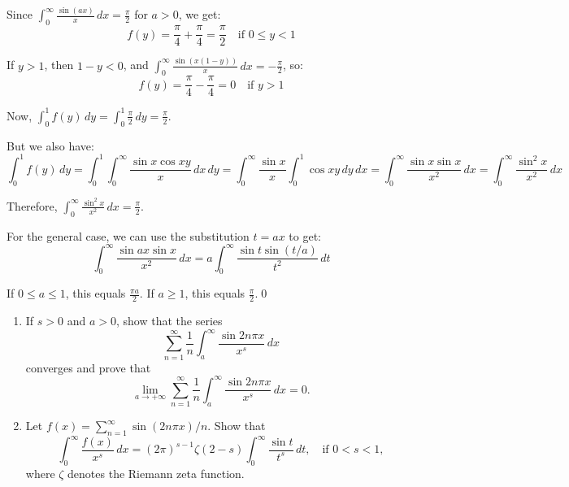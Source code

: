 Since $\int_{0}^{\infty} \frac{\sin(ax)}{x} \, dx = \frac{\pi}{2}$ for $a > 0$, we get:
\[f(y) = \frac{\pi}{4} + \frac{\pi}{4} = \frac{\pi}{2} \quad \text{if } 0 \leq y < 1\]

If $y > 1$, then $1-y < 0$, and $\int_{0}^{\infty} \frac{\sin(x(1-y))}{x} \, dx = -\frac{\pi}{2}$, so:
\[f(y) = \frac{\pi}{4} - \frac{\pi}{4} = 0 \quad \text{if } y > 1\]

Now, $\int_{0}^{1} f(y) \, dy = \int_{0}^{1} \frac{\pi}{2} \, dy = \frac{\pi}{2}$.

But we also have:
\[\int_{0}^{1} f(y) \, dy = \int_{0}^{1} \int_{0}^{\infty} \frac{\sin x \cos xy}{x} \, dx \, dy = \int_{0}^{\infty} \frac{\sin x}{x} \int_{0}^{1} \cos xy \, dy \, dx = \int_{0}^{\infty} \frac{\sin x \sin x}{x^2} \, dx = \int_{0}^{\infty} \frac{\sin^2 x}{x^2} \, dx\]

Therefore, $\int_{0}^{\infty} \frac{\sin^2 x}{x^2} \, dx = \frac{\pi}{2}$.

For the general case, we can use the substitution $t = ax$ to get:
\[\int_{0}^{\infty} \frac{\sin ax \sin x}{x^2} \, dx = a \int_{0}^{\infty} \frac{\sin t \sin(t/a)}{t^2} \, dt\]

If $0 \leq a \leq 1$, this equals $\frac{\pi a}{2}$. If $a \geq 1$, this equals $\frac{\pi}{2}$.\qed


\begin{problembox}
\begin{enumerate}[label=(\alph*)]
    \item If $s > 0$ and $a > 0$, show that the series
    \[\sum_{n=1}^{\infty} \frac{1}{n} \int_{a}^{\infty} \frac{\sin 2n\pi x}{x^{s}} \, dx\]
    converges and prove that
    \[\lim_{a \to +\infty} \sum_{n=1}^{\infty} \frac{1}{n} \int_{a}^{\infty} \frac{\sin 2n\pi x}{x^{s}} \, dx = 0.\]
    \item Let $f(x) = \sum_{n=1}^{\infty} \sin (2n\pi x)/n$. Show that
    \[\int_{0}^{\infty} \frac{f(x)}{x^{s}} \, dx = (2\pi)^{s-1} \zeta (2 - s) \int_{0}^{\infty} \frac{\sin t}{t^{s}} \, dt, \quad \text{if } 0 < s < 1,\]
    where $\zeta$ denotes the Riemann zeta function.
\end{enumerate}
\end{problembox}

